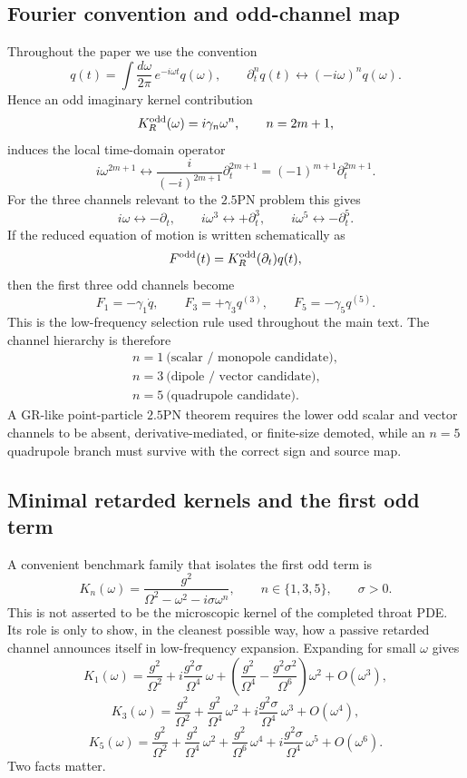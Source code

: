 \documentclass[11pt]{article}
\begin{document}
\subsection{Fourier convention and odd-channel map}
\label{app:lowfreq-signmap}

Throughout the paper we use the convention
\[
q(t)=\int \frac{d\omega}{2\pi}\,e^{-i\omega t}q(\omega),
\qquad
\partial_t^n q(t)
\longleftrightarrow
(-i\omega)^n q(\omega).
\]
Hence an odd imaginary kernel contribution
\[
K_R^{\rm odd}(\omega)=i\gamma_n\omega^n,
\qquad n=2m+1,
\]
induces the local time-domain operator
\[
i\omega^{2m+1}
\longleftrightarrow
\frac{i}{(-i)^{2m+1}}\partial_t^{2m+1}
=
(-1)^{m+1}\partial_t^{2m+1}.
\]
For the three channels relevant to the $2.5$PN problem this gives
\[
i\omega \longleftrightarrow -\partial_t,
\qquad
i\omega^3 \longleftrightarrow +\partial_t^3,
\qquad
i\omega^5 \longleftrightarrow -\partial_t^5.
\]
If the reduced equation of motion is written schematically as
\[
F^{\rm odd}(t)=K_R^{\rm odd}(\partial_t)q(t),
\]
then the first three odd channels become
\[
F_1=-\gamma_1\dot q,
\qquad
F_3=+\gamma_3 q^{(3)},
\qquad
F_5=-\gamma_5 q^{(5)}.
\]
This is the low-frequency selection rule used throughout the main text.  The
channel hierarchy is therefore
\[
\boxed{\begin{gathered}
n=1\ \text{(scalar / monopole candidate)},\\
n=3\ \text{(dipole / vector candidate)},\\
n=5\ \text{(quadrupole candidate)}.
\end{gathered}}
\]
A GR-like point-particle $2.5$PN theorem requires the lower odd scalar and
vector channels to be absent, derivative-mediated, or finite-size demoted, while
an $n=5$ quadrupole branch must survive with the correct sign and source map.

\subsection{Minimal retarded kernels and the first odd term}
\label{app:lowfreq-minimal-kernels}

A convenient benchmark family that isolates the first odd term is
\[
K_n(\omega)
=
\frac{g^2}{\Omega^2-\omega^2-i\sigma\omega^n},
\qquad
n\in\{1,3,5\},
\qquad
\sigma>0.
\]
This is not asserted to be the microscopic kernel of the completed throat PDE.
Its role is only to show, in the cleanest possible way, how a passive retarded
channel announces itself in low-frequency expansion.  Expanding for small
$\omega$ gives
\[
K_1(\omega)
=
\frac{g^2}{\Omega^2}
+
 i\frac{g^2\sigma}{\Omega^4}\,\omega
+
\left(\frac{g^2}{\Omega^4}-\frac{g^2\sigma^2}{\Omega^6}\right)\omega^2
+
O(\omega^3),
\]
\[
K_3(\omega)
=
\frac{g^2}{\Omega^2}
+
\frac{g^2}{\Omega^4}\,\omega^2
+
 i\frac{g^2\sigma}{\Omega^4}\,\omega^3
+
O(\omega^4),
\]
\[
K_5(\omega)
=
\frac{g^2}{\Omega^2}
+
\frac{g^2}{\Omega^4}\,\omega^2
+
\frac{g^2}{\Omega^6}\,\omega^4
+
 i\frac{g^2\sigma}{\Omega^4}\,\omega^5
+
O(\omega^6).
\]
Two facts matter.
\end{document}
